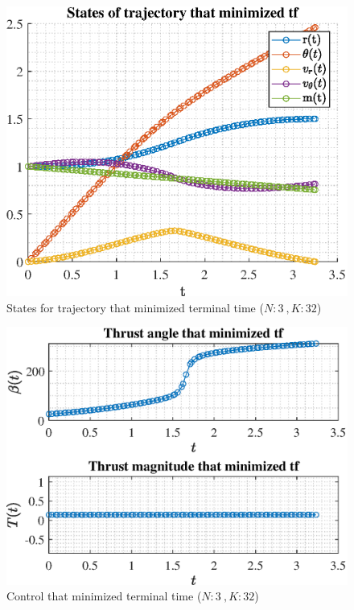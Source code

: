 \documentclass[]{article}
\begin{document}
	\begin{figure}
		\centering
		\includegraphics[scale=0.75]{states_N3_K32_C3_tf.eps}
		\caption{States for trajectory that minimized terminal time (\(N:3\ , K:32\))}
		\label{fig:states_N3_K32_C3_tf}
	\end{figure}
	\begin{figure}
		\centering
		\includegraphics[scale=0.75]{control_N3_K32_C3_tf.eps}
		\caption{Control that minimized terminal time (\(N:3\ , K:32\))}
		\label{fig:control_N3_K32_C3_tf}
	\end{figure}
\end{document}
